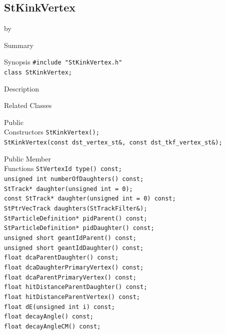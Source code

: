 \documentclass[twoside]{article}
\newcommand{\entrylabel}[1]{\mbox{\textbf{{#1}}}\hfil}%
\newenvironment{entry}
{\begin{list}{}%
    {\renewcommand{\makelabel}{\entrylabel}%
     \setlength{\labelwidth}{90pt}%
     \setlength{\leftmargin}{\labelwidth}
     \advance\leftmargin by \labelsep%
      }%
    }%
  {\end{list}}
\newcommand{\Entrylabel}[1]%
{\raisebox{0pt}[1ex][0pt]{\makebox[\labelwidth][l]%
    {\parbox[t]{\labelwidth}{\hspace{0pt}\textbf{{#1}}}}}}
\newenvironment{Entry}%
{\renewcommand{\entrylabel}{\Entrylabel}\begin{entry}}%
  {\end{entry}}
\begin{document}
\subsection{StKinkVertex}
\label{sec:StKinkVertex}
\begin{Entry}
\item[Summary]
\item[Synopsis]
    \verb+#include "StKinkVertex.h"+\\
    \verb+class StKinkVertex;+\\
\item[Description]
\item[Related Classes]
\item[Public\\ Constructors]
    \verb+StKinkVertex();+\\
    \verb+StKinkVertex(const dst_vertex_st&, const dst_tkf_vertex_st&);+\\
\item[Public Member\\ Functions]
    \verb+StVertexId type() const;+\\
    \verb+unsigned int numberOfDaughters() const;+\\
    \verb+StTrack* daughter(unsigned int = 0);+\\
    \verb+const StTrack* daughter(unsigned int = 0) const;+\\
    \verb+StPtrVecTrack daughters(StTrackFilter&);+\\
    \verb+StParticleDefinition* pidParent() const;+\\
    \verb+StParticleDefinition* pidDaughter() const;+\\
    \verb+unsigned short geantIdParent() const;+\\
    \verb+unsigned short geantIdDaughter() const;+\\
    \verb+float dcaParentDaughter() const;+\\
    \verb+float dcaDaughterPrimaryVertex() const;+\\
    \verb+float dcaParentPrimaryVertex() const;+\\
    \verb+float hitDistanceParentDaughter() const;+\\
    \verb+float hitDistanceParentVertex() const;+\\
    \verb+float dE(unsigned int i) const;+\\
    \verb+float decayAngle() const;+\\
    \verb+float decayAngleCM() const;+\\

\end{Entry}
\end{document}
